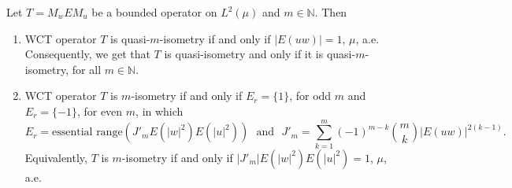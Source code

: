 \documentclass[10pt,a4paper]{amsart}
\begin{document}
\begin{thm}\label{t1.6}
Let $T=M_wEM_u$ be a bounded operator on $L^2(\mu)$ and $m\in \mathbb{N}$. Then
\begin{enumerate}
  \item WCT operator $T$ is quasi-$m$-isometry if and only if $|E(uw)|=1$, $\mu$, a.e. Consequently, we get that $T$ is quasi-isometry and only if it is quasi-$m$-isometry, for all $m\in \mathbb{N}$.\\
    
  \item WCT operator $T$ is $m$-isometry if and only if $E_r=\{1\}$, for odd $m$ and $E_r=\{-1\}$, for even $m$, in which 
    $$E_r=\text{essential\ range}(J'_mE(|w|^2)E(|u|^2))\ \ \ \text{and} \ \ \ J'_m=\sum_{k=1}^{m}(-1)^{m-k}\binom{m}{k}|E(uw)|^{2(k-1)}.$$
    Equivalently, $T$ is $m$-isometry if and only if $|J'_m|E(|w|^2)E(|u|^2)=1$, $\mu$, a.e.
  
\end{enumerate}
\end{thm}
\end{document}
